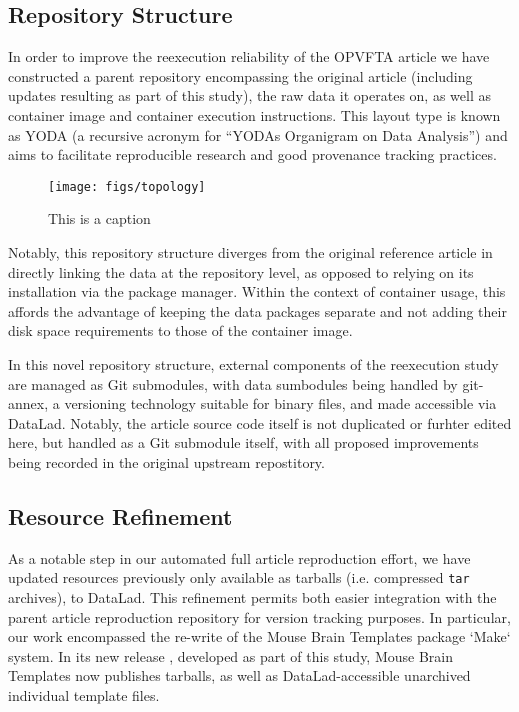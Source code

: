 \subsection{Repository Structure}
In order to improve the reexecution reliability of the OPVFTA article we have constructed a parent repository encompassing the original article (including updates resulting as part of this study), the raw data it operates on, as well as container image and container execution instructions.
This layout type is known as YODA (a recursive acronym for “YODAs Organigram on Data Analysis”) and aims to facilitate reproducible research and good provenance tracking practices.

\begin{figure}
	\centering
	\texttt{[image: figs/topology]}
	\caption{
		This is a caption
	}
	\label{fig:topology}
\end{figure}

Notably, this repository structure diverges from the original reference article in directly linking the data at the repository level, as opposed to relying on its installation via the package manager.
Within the context of container usage, this affords the advantage of keeping the data packages separate and not adding their disk space requirements to those of the container image.

In this novel repository structure, external components of the reexecution study are managed as Git submodules, with data sumbodules being handled by git-annex, a versioning technology suitable for binary files, and made accessible via DataLad.
Notably, the article source code itself is not duplicated or furhter edited here, but handled as a Git submodule itself, with all proposed improvements being recorded in the original upstream repostitory.


\subsection{Resource Refinement}

As a notable step in our automated full article reproduction effort, we have updated resources previously only available as tarballs (i.e. compressed \texttt{tar} archives), to DataLad.
This refinement permits both easier integration with the parent article reproduction repository for version tracking purposes.
In particular, our work encompassed the re-write of the Mouse Brain Templates package \cite{mbt05}  `Make` system.
In its new release \cite{mbt10}, developed as part of this study, Mouse Brain Templates now publishes tarballs, as well as DataLad-accessible unarchived individual template files.
